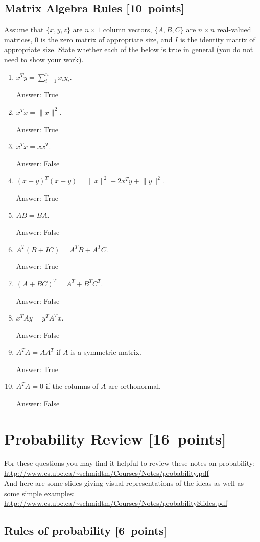 \documentclass{article}
\newcommand{\blu}[1]{{\textcolor{blu}{#1}}}
\newcommand{\gre}[1]{\textcolor{gre}{#1}}
\newcommand\ans[1]{\par\gre{Answer: #1}}
\let\ask\blu
\newcommand\pts[1]{\textcolor{pointscolour}{[#1~points]}}
\newcommand{\norm}[1]{\lVert #1 \rVert}
\begin{document}
  \subsection{Matrix Algebra Rules \pts{10}}

  Assume that $\{x,y,z\}$ are $n \times 1$ column vectors, $\{A,B,C\}$ are $n \times n$ real-valued matrices, $0$ is the zero matrix of appropriate size, and $I$ is the identity matrix of appropriate size. \ask{State whether each of the below is true in general} (you do not need to show your work).

  \begin{enumerate}
  \item $x^Ty = \sum_{i=1}^n x_iy_i$.  
  \ans{True}
  \item $x^Tx = \norm{x}^2$.
  \ans{True}
  \item $x^Tx = xx^T$.
  \ans{False}
  \item $(x-y)^T(x-y) = \norm{x}^2 - 2x^Ty + \norm{y}^2$.
  \ans{True}
  \item $AB=BA$.
  \ans{False}
  \item $A^T(B + IC) = A^TB + A^TC$.
  \ans{True}
  \item $(A + BC)^T = A^T + B^TC^T$.
  \ans{False}
  \item $x^TAy = y^TA^Tx$.
  \ans{False}
  \item $A^TA = AA^T$ if $A$ is a symmetric matrix.
  \ans{True}
  \item $A^TA = 0$ if the columns of $A$ are orthonormal.
  \ans{False}
  \end{enumerate}


  \clearpage\section{Probability Review \pts{16}}


  For these questions you may find it helpful to review these notes on probability:\\
  \url{http://www.cs.ubc.ca/~schmidtm/Courses/Notes/probability.pdf}\\
  And here are some slides giving visual representations of the ideas as well as some simple examples:\\
  \url{http://www.cs.ubc.ca/~schmidtm/Courses/Notes/probabilitySlides.pdf}

  \subsection{Rules of probability \pts{6}}
\end{document}
